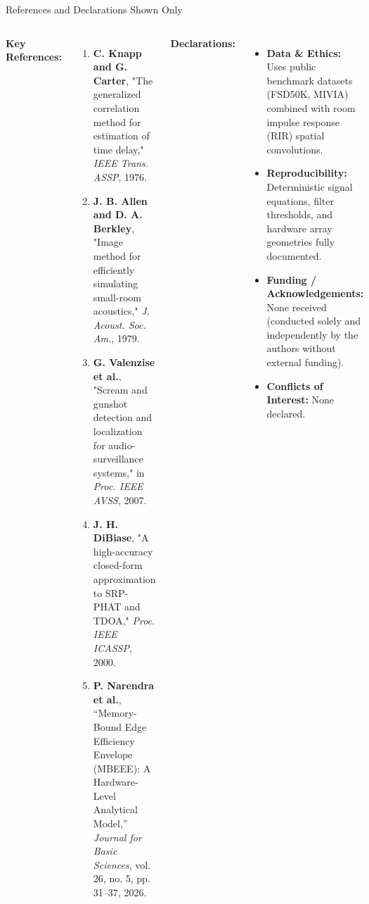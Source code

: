 \documentclass[aspectratio=169,10pt]{beamer}
\begin{document}
\begin{frame}{References and Declarations \hfill {\small\color{gray}Shown Only}}
\begin{columns}[T]
\textbf{Key References:}
\tiny
\begin{enumerate}
    \item \textbf{C. Knapp and G. Carter}, "The generalized correlation method for estimation of time delay," \textit{IEEE Trans. ASSP}, 1976.
    \item \textbf{J. B. Allen and D. A. Berkley}, "Image method for efficiently simulating small-room acoustics," \textit{J. Acoust. Soc. Am.}, 1979.
    \item \textbf{G. Valenzise et al.}, "Scream and gunshot detection and localization for audio-surveillance systems," in \textit{Proc. IEEE AVSS}, 2007.
    \item \textbf{J. H. DiBiase}, "A high-accuracy closed-form approximation to SRP-PHAT and TDOA," \textit{Proc. IEEE ICASSP}, 2000.
    \item \textbf{P. Narendra et al.}, ``Memory-Bound Edge Efficiency Envelope (MBEEE): A Hardware-Level Analytical Model,'' \textit{Journal for Basic Sciences}, vol. 26, no. 5, pp. 31--37, 2026.
\end{enumerate}

\textbf{Declarations:}
\tiny
\begin{itemize}
    \item \textbf{Data \& Ethics:} Uses public benchmark datasets (FSD50K, MIVIA) combined with room impulse response (RIR) spatial convolutions.
    \item \textbf{Reproducibility:} Deterministic signal equations, filter thresholds, and hardware array geometries fully documented.
    \item \textbf{Funding / Acknowledgements:} None received (conducted solely and independently by the authors without external funding).
    \item \textbf{Conflicts of Interest:} None declared.
\end{itemize}
\end{columns}
\end{frame}
\end{document}
